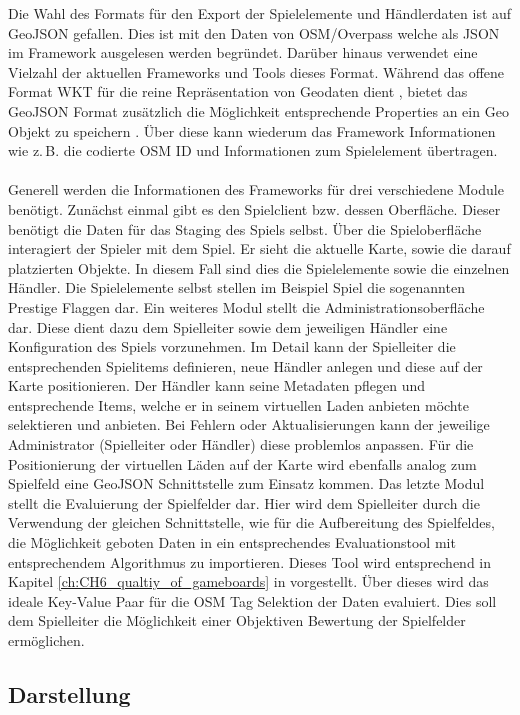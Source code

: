 Die Wahl des Formats für den Export der Spielelemente und Händlerdaten ist auf GeoJSON gefallen.
Dies ist mit den Daten von OSM/Overpass welche als JSON im Framework ausgelesen werden begründet. Darüber hinaus verwendet eine Vielzahl der aktuellen Frameworks und Tools dieses Format. Während das offene Format WKT für die reine Repräsentation von Geodaten dient \cite{Stolze.2003}, bietet das GeoJSON Format zusätzlich die Möglichkeit entsprechende Properties an ein Geo Objekt zu speichern \cite{Butler.2008}. Über diese kann wiederum das Framework Informationen wie z.\,B. die codierte OSM ID und Informationen zum Spielelement übertragen.
\\\\
Generell werden die Informationen des Frameworks für drei verschiedene Module benötigt.
Zunächst einmal gibt es den Spielclient bzw. dessen Oberfläche. Dieser benötigt die Daten für das Staging des Spiels selbst.
Über die Spieloberfläche interagiert der Spieler mit dem Spiel. Er sieht die aktuelle Karte, sowie die darauf platzierten Objekte. In diesem Fall sind dies die Spielelemente sowie die einzelnen Händler. Die Spielelemente selbst stellen im Beispiel Spiel die sogenannten Prestige Flaggen dar.
Ein weiteres Modul stellt die Administrationsoberfläche dar. Diese dient dazu dem Spielleiter sowie dem jeweiligen Händler eine Konfiguration des Spiels vorzunehmen. Im Detail kann der Spielleiter die entsprechenden Spielitems definieren, neue Händler anlegen und diese auf der Karte positionieren. Der Händler kann seine Metadaten pflegen und entsprechende Items, welche er in seinem virtuellen Laden anbieten möchte selektieren und anbieten. Bei Fehlern oder Aktualisierungen kann der jeweilige Administrator (Spielleiter oder Händler) diese problemlos anpassen. Für die Positionierung der virtuellen Läden auf der Karte wird ebenfalls analog zum Spielfeld eine GeoJSON Schnittstelle zum Einsatz kommen.
Das letzte Modul stellt die Evaluierung der Spielfelder dar. Hier wird dem Spielleiter durch die Verwendung der gleichen Schnittstelle, wie für die Aufbereitung des Spielfeldes, die Möglichkeit geboten Daten in ein entsprechendes Evaluationstool mit entsprechendem Algorithmus  zu importieren. Dieses Tool wird entsprechend in Kapitel \ref{ch:CH6_qualtiy_of_gameboards} in vorgestellt. Über dieses wird das ideale Key-Value Paar für die OSM Tag Selektion der Daten evaluiert. Dies soll dem Spielleiter die Möglichkeit einer Objektiven Bewertung der Spielfelder ermöglichen.

\subsection*{Darstellung}

